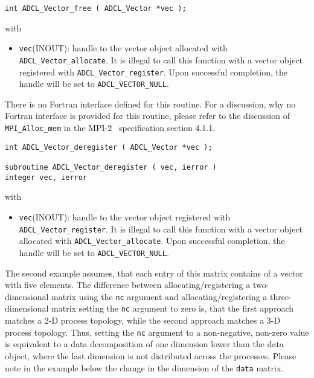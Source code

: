 \hspace{1cm}

\begin{verbatim}
int ADCL_Vector_free ( ADCL_Vector *vec );
\end{verbatim}
with
\begin{itemize}
\item {\tt vec}(INOUT): handle to the vector object allocated with {\tt
    ADCL\_Vector\-\_allocate}. It is illegal to call this function with a
  vector object registered with {\tt ADCL\_Vector\_register}. Upon successful
  completion, the handle will be set to {\tt ADCL\_VECTOR\_NULL}.
\end{itemize}
There is no Fortran interface defined for this routine. For a discussion, why
no Fortran interface is provided for this routine, please refer to the
discussion of {\tt MPI\_Alloc\_mem} in the MPI-2~\cite{mpi2} specification
section 4.1.1.  \hspace{1cm}

\begin{verbatim}
int ADCL_Vector_deregister ( ADCL_Vector *vec );

subroutine ADCL_Vector_deregister ( vec, ierror )
integer vec, ierror
\end{verbatim}
with
\begin{itemize}
\item {\tt vec}(INOUT): handle to the vector object registered with {\tt
    ADCL\_Vector\-\_register}. It is illegal to call this function with a
  vector object allocated with {\tt ADCL\_Vector\_allocate}. Upon successful
  completion, the handle will be set to {\tt ADCL\_VECTOR\_NULL}.
\end{itemize}


The second example assumes, that each entry of this matrix contains of a
vector with five elements. The difference between allocating/registering a
two-dimensional matrix using the {\tt nc} argument and allocating/registering
a three-dimensional matrix setting the {\tt nc} argument to zero is, that the
first approach matches a 2-D process topology, while the second approach
matches a 3-D process topology. Thus, setting the {\tt nc} argument to a
non-negative, non-zero value is equivalent to a data decomposition of one
dimension lower than the data object, where the last dimension is not
distributed across the processes. Please note in the example below the change
in the dimension of the {\tt data} matrix.

